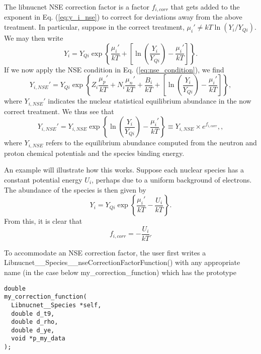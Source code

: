 \documentclass{article}    %
\begin{document}
The libnucnet NSE correction factor is a factor $f_{i,corr}$ that gets added
to the exponent in Eq. (\ref{eq:y_i_nse})
to correct for deviations away from the above treatment.  In particular,
suppose in the correct treatment,
$\mu_i' \neq kT \ln \left( Y_i / Y_{Qi} \right)$.  We may then write
\begin{equation}
Y_i = Y_{Qi} \exp\left\{\frac{\mu_i'}{kT} + \left[ \ln\left(\frac{Y_i}{Y_{Qi}}
\right)- \frac{\mu_i'}{kT}\right]\right\}.
\end{equation}
If we now apply the NSE condition in Eq. (\ref{eq:nse_condition}),
we find
\begin{equation}
Y_{i,NSE}' = Y_{Qi} \exp\left\{
Z_i \frac{\mu_p'}{kT} + N_i \frac{\mu_n'}{kT} + \frac{B_i}{kT} +
\left[ \ln\left(\frac{Y_i}{Y_{Qi}}
\right)- \frac{\mu_i'}{kT}\right]
\right\}, \label{eq:y_i_nse_f}
\end{equation}
where $Y_{i,NSE}'$ indicates the nuclear statistical equilibrium abundance
in the now correct
treatment.  We thus see that
\begin{equation}
Y_{i,NSE}' = Y_{i,NSE} \exp\left\{
\ln\left(\frac{Y_i}{Y_{Qi}}
\right)- \frac{\mu_i'}{kT}
\right\} \equiv Y_{i,NSE} \times e^{f_{i,corr}}, \label{eq:y_i_nse_f_2},
\end{equation}
where $Y_{i,NSE}$ refers to the equilibrium abundance computed from the
neutron and proton chemical potentials and the species binding energy.

An example will illustrate how this works.  Suppose each nuclear species
has a constant potential energy $U_i$, perhaps due to a uniform background
of electrons.  The abundance of the species is then given by
\begin{equation}
Y_i = Y_{Qi} \exp\left\{\frac{\mu_i'}{kT} - \frac{U_i}{kT}\right\}.
\end{equation}
From this, it is clear that
\begin{equation}
f_{i,corr} = -\frac{U_i}{kT}.
\end{equation}

To accommodate an NSE correction factor, the user first writes a
Libnucnet\_\_Species\_\_nseCorrectionFactorFunction() with any appropriate
name (in the case below my\_correction\_function)
which has the prototype

\begin{verbatim}
double
my_correction_function(
  Libnucnet__Species *self,
  double d_t9,
  double d_rho,
  double d_ye,
  void *p_my_data
);
\end{verbatim}
\end{document}
